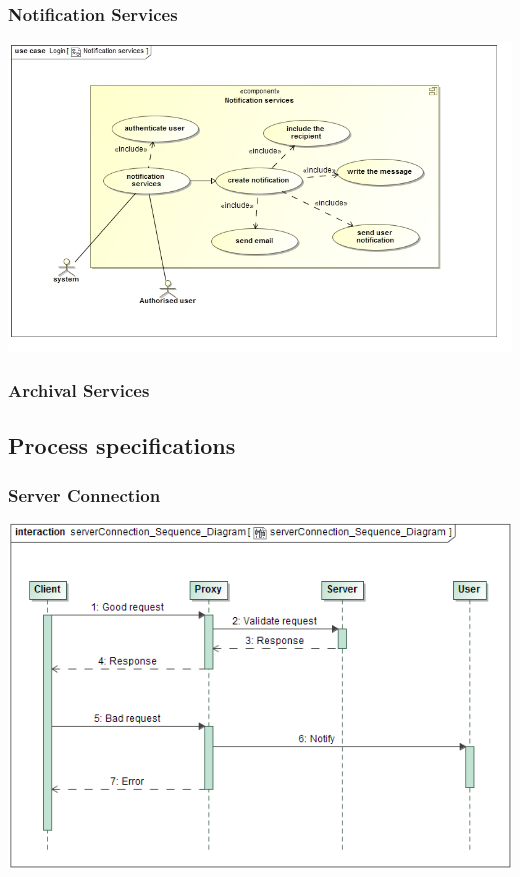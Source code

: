 \documentclass[11pt]{article}
\begin{document}
	\subsubsection{Notification Services}
	\begin{center}
		\includegraphics[width=\textwidth]{../Images/NotificationServicesUC.jpg}\\[0.5cm]
	\end{center}
	\subsubsection{Archival Services}
	
	\newpage
	
	\subsection{Process specifications}
	
	\subsubsection{Server Connection}
	\begin{center}
		\includegraphics[width=\textwidth]{../Images/Server_Connection_Sequence_Diagram.png}\\[0.5cm]
	\end{center}
	
\end{document}
